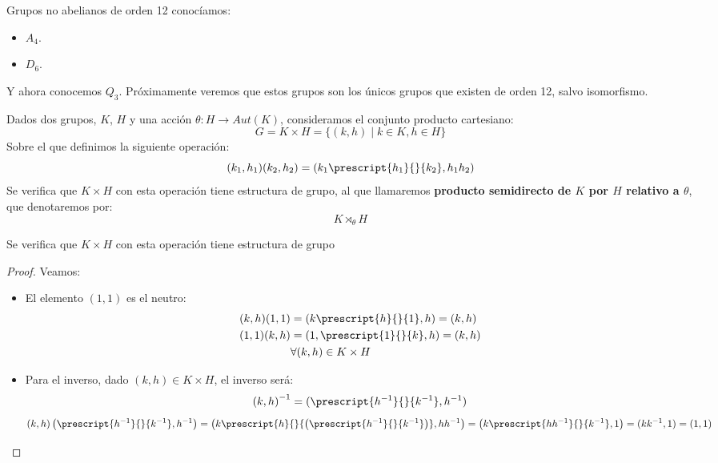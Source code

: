 \begin{ejemplo}
    Grupos no abelianos de orden 12 conocíamos:
    \begin{itemize}
        \item $A_4$.
        \item $D_6$.
    \end{itemize}
    Y ahora conocemos $Q_3$. Próximamente veremos que estos grupos son los únicos grupos que existen de orden 12, salvo isomorfismo.
\end{ejemplo}

\begin{definicion}
    Dados dos grupos, $K$, $H$ y una acción $\theta: H \to Aut(K)$, consideramos el conjunto producto cartesiano:
    \begin{equation*}
        G = K\times H = \{(k,h)\mid k\in K, h\in H\}
    \end{equation*}
    Sobre el que definimos la siguiente operación:
    \begin{equation*}
        (k_1,h_1)(k_2,h_2) = (k_1 \prescript{h_1}{}{k_2}, h_1h_2)
    \end{equation*}
    Se verifica que $K\times H$ con esta operación tiene estructura de grupo, al que llamaremos \textbf{producto semidirecto de $K$ por $H$ relativo a $\theta$}, que denotaremos por:
    \begin{equation*}
        K \rtimes_\theta H
    \end{equation*}
\end{definicion}

\begin{teo}
    Se verifica que $K\times H$ con esta operación tiene estructura de grupo
    \begin{proof} %
        Veamos:
        \begin{itemize}
            \item El elemento $(1,1)$ es el neutro:
                \begin{align*}
                    (k,h)(1,1) &= (k\prescript{h}{}{1},h) = (k,h) \\
                    (1,1)(k,h) &= (1, \prescript{1}{}{k},h) = (k,h) \\
                               &\forall (k,h)\in K\times H
                \end{align*}
            \item Para el inverso, dado $(k,h)\in K\times H$, el inverso será:
                \begin{equation*}
                    {(k,h)}^{-1} = (\prescript{h^{-1}}{}{k^{-1}},h^{-1})
                \end{equation*}
                \begin{equation*}
                    (k,h)\left(\prescript{h^{-1}}{}{k^{-1}},h^{-1}\right) = \left(k\prescript{h}{}{\left(\prescript{h^{-1}}{}{k^{-1}}\right)}, hh^{-1}\right) = \left(k\prescript{hh^{-1}}{}{k^{-1}}, 1\right) = (kk^{-1},1) = (1,1)
                \end{equation*}
        \end{itemize}
    \end{proof}
\end{teo}

